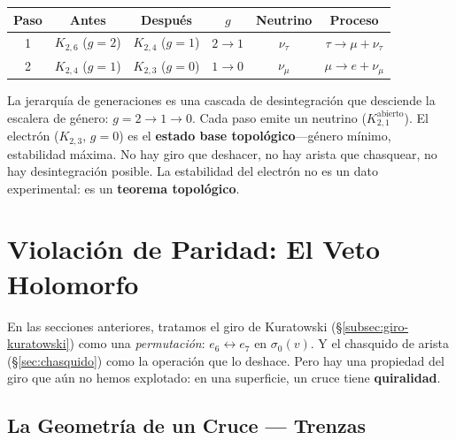 \documentclass[11pt, a4paper, openany]{book}
\begin{document}
\begin{center}
\renewcommand{\arraystretch}{1.2}
\begin{tabular}{cccccc}
\toprule
Paso & Antes & Después & $g$ & Neutrino & Proceso \\
\midrule
1 & $K_{2,6}$ ($g{=}2$) & $K_{2,4}$ ($g{=}1$) & $2 \to 1$
  & $\nu_\tau$ & $\tau \to \mu + \nu_\tau$ \\
2 & $K_{2,4}$ ($g{=}1$) & $K_{2,3}$ ($g{=}0$) & $1 \to 0$
  & $\nu_\mu$ & $\mu \to e + \nu_\mu$ \\
\bottomrule
\end{tabular}
\end{center}

\begin{result}[title={El electrón es el estado base topológico}]
La jerarquía de generaciones es una cascada de desintegración que
desciende la escalera de género: $g = 2 \to 1 \to 0$. Cada paso
emite un neutrino ($K_{2,1}^{\mathrm{abierto}}$). El electr\'on ($K_{2,3}$, $g = 0$) es
el \textbf{estado base topológico}---género mínimo, estabilidad
máxima. No hay giro que deshacer, no hay arista que chasquear, no hay
desintegración posible. La estabilidad del electrón no es un dato
experimental: es un \textbf{teorema topológico}.
\end{result}


\section{Violaci\'on de Paridad: El Veto Holomorfo}
\label{sec:parity-violation}


En las secciones anteriores, tratamos el giro de Kuratowski
(\S\ref{subsec:giro-kuratowski}) como una \emph{permutaci\'on}:
$e_6 \leftrightarrow e_7$ en $\sigma_0(v)$. Y el chasquido de arista
(\S\ref{sec:chasquido}) como la operaci\'on que lo deshace. Pero hay una
propiedad del giro que a\'un no hemos explotado: en una superficie, un
cruce tiene \textbf{quiralidad}.

\subsection{La Geometr\'ia de un Cruce --- Trenzas}
\end{document}
